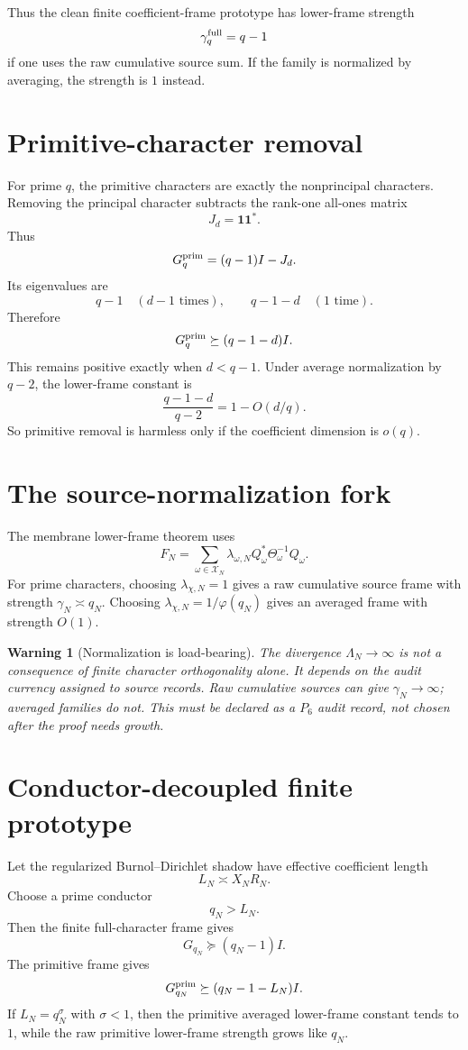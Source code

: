 \documentclass[11pt]{article}
\newtheorem{warning}{Warning}
\begin{document}
Thus the clean finite coefficient-frame prototype has lower-frame strength
\[
\gamma_q^{\rm full}=q-1
\]
if one uses the raw cumulative source sum.  If the family is normalized by averaging, the strength is $1$ instead.

\section{Primitive-character removal}
For prime $q$, the primitive characters are exactly the nonprincipal characters.  Removing the principal character subtracts the rank-one all-ones matrix
\[
J_d=\mathbf 1\mathbf 1^*.
\]
Thus
\[
G_q^{\rm prim}=(q-1)I-J_d.
\]
Its eigenvalues are
\[
q-1\quad(d-1\text{ times}),
\qquad
q-1-d\quad(1\text{ time}).
\]
Therefore
\[
G_q^{\rm prim}\succeq(q-1-d)I.
\]
This remains positive exactly when $d<q-1$.  Under average normalization by $q-2$, the lower-frame constant is
\[
\frac{q-1-d}{q-2}=1-O(d/q).
\]
So primitive removal is harmless only if the coefficient dimension is $o(q)$.

\section{The source-normalization fork}
The membrane lower-frame theorem uses
\[
F_N=\sum_{\omega\in\mathcal X_N}\lambda_{\omega,N}Q_\omega^*\Theta_\omega^{-1}Q_\omega.
\]
For prime characters, choosing $\lambda_{\chi,N}=1$ gives a raw cumulative source frame with strength $\gamma_N\asymp q_N$.  Choosing $\lambda_{\chi,N}=1/\varphi(q_N)$ gives an averaged frame with strength $O(1)$.

\begin{warning}[Normalization is load-bearing]
The divergence $\Lambda_N\to\infty$ is not a consequence of finite character orthogonality alone.  It depends on the audit currency assigned to source records.  Raw cumulative sources can give $\gamma_N\to\infty$; averaged families do not.  This must be declared as a $P_6$ audit record, not chosen after the proof needs growth.
\end{warning}

\section{Conductor-decoupled finite prototype}
Let the regularized Burnol--Dirichlet shadow have effective coefficient length
\[
L_N\asymp X_NR_N.
\]
Choose a prime conductor
\[
q_N>L_N.
\]
Then the finite full-character frame gives
\[
G_{q_N}\succeq(q_N-1)I.
\]
The primitive frame gives
\[
G_{q_N}^{\rm prim}\succeq(q_N-1-L_N)I.
\]
If $L_N=q_N^\sigma$ with $\sigma<1$, then the primitive averaged lower-frame constant tends to $1$, while the raw primitive lower-frame strength grows like $q_N$.
\end{document}

